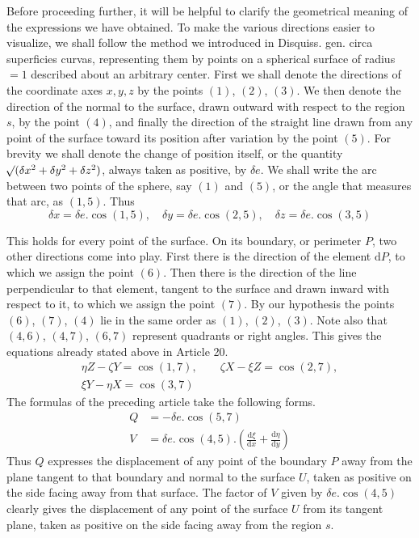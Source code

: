 Before proceeding further, it will be helpful to clarify the geometrical meaning of the expressions we have obtained. To make the various directions easier to visualize, we shall follow the method we introduced in Disquiss. gen. circa superficies curvas, representing them by points on a spherical surface of radius $=1$ described about an arbitrary center. First we shall denote the directions of the coordinate axes $x,y,z$ by the points $(1)$, $(2)$, $(3)$. We then denote the direction of the normal to the surface, drawn outward with respect to the region $s$, by the point $(4)$, and finally the direction of the straight line drawn from any point of the surface toward its position after variation by the point $(5)$. For brevity we shall denote the change of position itself, or the quantity $\mathord{{}^{}\!\surd}(\delta x^2+\delta y^2+\delta z^2)$, always taken as positive, by $\delta e$. We shall write the arc between two points of the sphere, say $(1)$ and $(5)$, or the angle that measures that arc, as $(1,5)$. Thus
\[
\delta x=\delta e.\cos(1,5),\quad \delta y=\delta e.\cos(2,5),\quad \delta z=\delta e.\cos(3,5)
\]

This holds for every point of the surface. On its boundary, or perimeter $P$, two other directions come into play. First there is the direction of the element $\mathrm{d}P$, to which we assign the
point $(6)$. Then there is the direction of the line perpendicular to that element, tangent to the surface and drawn inward with respect to it, to which we assign the point $(7)$. By our hypothesis the points $(6)$, $(7)$, $(4)$ lie in the same order as $(1)$, $(2)$, $(3)$. Note also that $(4,6)$, $(4,7)$, $(6,7)$ represent quadrants or right angles. This gives the equations already stated above in Article 20.
\[
\begin{gathered}
\eta Z-\zeta Y=\cos(1,7),\qquad \zeta X-\xi Z=\cos(2,7),\\
\xi Y-\eta X=\cos(3,7)
\end{gathered}
\]
The formulas of the preceding article take the following forms.
\[
\begin{aligned}
Q&=-\delta e.\cos(5,7)\\
V&=\delta e.\cos(4,5).(\frac{\mathrm{d}\xi}{\mathrm{d}x}+\frac{\mathrm{d}\eta}{\mathrm{d}y})
\end{aligned}
\]
Thus $Q$ expresses the displacement of any point of the boundary $P$ away from the plane tangent to that boundary and normal to the surface $U$, taken as positive on the side facing away from that surface. The factor of $V$ given by $\delta e.\cos(4,5)$ clearly gives the displacement of any point of the surface $U$ from its tangent plane, taken as positive on the side facing away from the region $s$.

